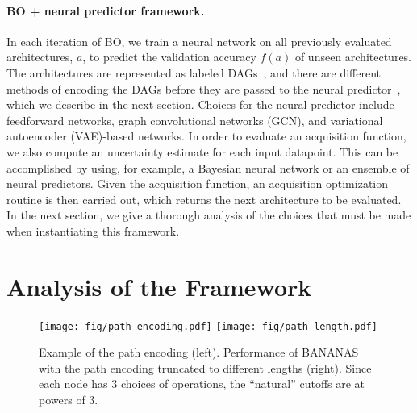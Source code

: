 \documentclass[11pt]{article}
\numberwithin{equation}{section}
\numberwithin{figure}{section}
\theoremstyle{plain}
\theoremstyle{definition}
\newcounter{Frame}
\begin{document}
\paragraph{BO + neural predictor framework.}
In each iteration of BO, we train a neural network
on all previously evaluated architectures, $a$, to predict the validation
accuracy $f(a)$ of unseen architectures.
The architectures are represented as labeled DAGs~\cite{nasbench, nasbench201},
and there are different methods of encoding the DAGs before they are passed to
the neural predictor~\cite{nasbench, white2020study}, 
which we describe in the next section.
Choices for the neural predictor include feedforward networks, 
graph convolutional networks (GCN),
and variational autoencoder (VAE)-based networks.
In order to evaluate an acquisition function, we also compute an uncertainty
estimate for each input datapoint. This can be accomplished by using,
for example, a Bayesian neural network or an ensemble of neural predictors.
Given the acquisition function, an acquisition optimization routine is then 
carried out, which returns the next architecture to be evaluated.
In the next section, we give a thorough analysis of the choices that
must be made when instantiating this framework.


 
\section{Analysis of the Framework}
\label{sec:methodology}

\begin{comment}
\begin{figure}
\centering
    \texttt{[image: fig/path\_encoding.pdf]}
    \caption{Example of the path encoding.}
    \label{fig:path_encoding_figure}
\end{figure}
\end{comment}


\begin{figure*}[h]
\centering
\texttt{[image: fig/path\_encoding.pdf]}
\hspace{1cm}
\texttt{[image: fig/path\_length.pdf]}
\caption{Example of the path encoding (left).
Performance of BANANAS with the path encoding truncated to different
lengths (right). Since each node has 3 choices of operations, the ``natural''
cutoffs are at powers of 3.
}
\label{fig:path_encoding}
\end{figure*}
\end{document}
